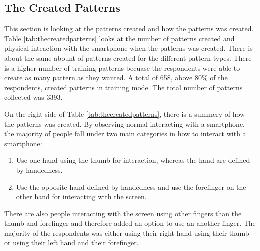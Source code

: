 {{  \clearpage
  \subsection{The Created Patterns}\label{sec:thecreatedpatterns}

    This section is looking at the patterns created and how the patterns was created. Table \ref{tab:thecreatedpatterns} looks at the number of patterns created and physical inteaction with the smartphone when the patterns was created. There is about the same abount of patterns created for the different pattern types. There is a higher number of training patterns becuase the respondents were able to create as many pattern as they wanted. A total of 658, above 80\% of the respondents, created patterns in training mode. The total number of patterns collected was 3393. 

    On the right side of Table \ref{tab:thecreatedpatterns}, there is a summery of how the patterns was created. By observing normal interacting with a smartphone, the majority of people fall under two main categories in how to interact with a smartphone:

      \begin{enumerate}
        \item Use one hand using the thumb for interaction, whereas the hand are defined by handedness.
        \item Use the opposite hand defined by handedness and use the forefinger on the other hand for interacting with the screen.
      \end{enumerate}

    There are also people interacting with the screen using other fingers than the thumb and forefinger and therefore added an option to use an another finger. The majority of the respondents was either using their right hand using their thumb or using their left hand and their forefinger.

}}

